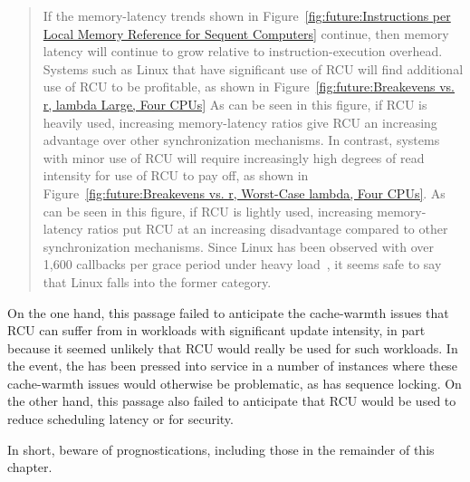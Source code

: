 \begin{quote}
	If the memory-latency trends shown in
	Figure~\ref{fig:future:Instructions per Local Memory Reference for Sequent Computers}
	continue, then memory latency will continue to grow relative
	to instruction-execution overhead.
	Systems such as Linux that have significant use of RCU will find
	additional use of RCU to be profitable, as shown in
	Figure~\ref{fig:future:Breakevens vs. r, lambda Large, Four CPUs}
	As can be seen in this figure, if RCU is heavily used, increasing
	memory-latency ratios give RCU an increasing advantage over other
	synchronization mechanisms.
	In contrast, systems with minor
	use of RCU will require increasingly high degrees of read intensity
	for use of RCU to pay off, as shown in
	Figure~\ref{fig:future:Breakevens vs. r, Worst-Case lambda, Four CPUs}.
	As can be seen in this figure, if RCU is lightly used,
	increasing memory-latency ratios
	put RCU at an increasing disadvantage compared to other synchronization
	mechanisms.
	Since Linux has been observed with over 1,600 callbacks per grace
	period under heavy load~\cite{Sarma04c},
	it seems safe to say that Linux falls into the former category.
\end{quote}

On the one hand, this passage failed to anticipate the cache-warmth
issues that RCU can suffer from in workloads with significant update
intensity, in part because it seemed unlikely that RCU would really
be used for such workloads.
In the event, the  has been pressed into 
service in a number of instances where these cache-warmth issues would
otherwise be problematic, as has sequence locking.
On the other hand, this passage also failed to anticipate that
RCU would be used to reduce scheduling latency or for security.

In short, beware of prognostications, including those in the remainder
of this chapter.
